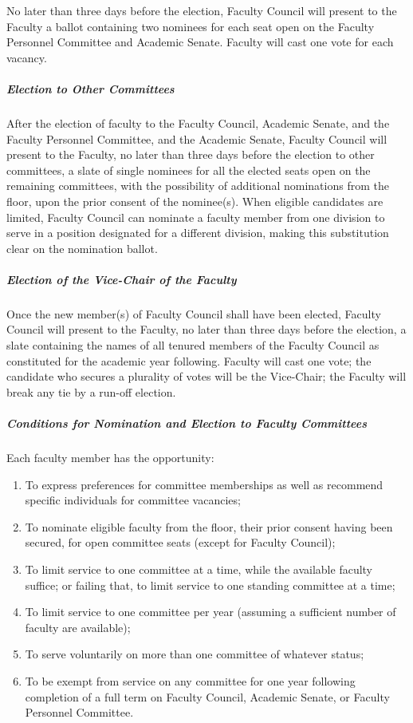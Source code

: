 					No later than three days before the election, Faculty Council will present to the Faculty a ballot containing two nominees for each seat open on the Faculty Personnel Committee and Academic Senate.  Faculty will cast one vote for each vacancy.
				\subparagraph{Election to Other Committees}
					After the election of faculty to the Faculty Council, Academic Senate, and the Faculty Personnel Committee, and the Academic Senate, Faculty Council will present to the Faculty, no later than three days before the election to other committees, a slate of single nominees for all the elected seats open on the remaining committees, with the possibility of additional nominations from the floor, upon the prior consent of the nominee(s).  When eligible candidates are limited, Faculty Council can nominate a faculty member from one division to serve in a position designated for a different division, making this substitution clear on the nomination ballot.
				\subparagraph{Election of the Vice-Chair of the Faculty}
					Once the new member(s) of Faculty Council shall have been elected, Faculty Council will present to the Faculty, no later than three days before the election, a slate containing the names of all tenured members of the Faculty Council as constituted for the academic year following.  Faculty will cast one vote; the candidate who secures a plurality of votes will be the Vice-Chair; the Faculty will break any tie by a run-off election.
				\subparagraph{Conditions for Nomination and Election to Faculty Committees}
					\label{sec:CommitteesOfTheFaculty-Conditions}
					Each faculty member has the opportunity:
					\begin{enumerate}[label=\alph*)]
						\item{
							\label{sec:CommitteesOfTheFaculty-Conditions-First}
							To express preferences for committee memberships as well as recommend specific individuals for committee vacancies;}
						\item{To nominate eligible faculty from the floor, their prior consent having been secured, for open committee seats (except for Faculty Council);}
						\item{To limit service to one committee at a time, while the available faculty suffice; or failing that, to limit service to one standing committee at a time;}
						\item{To limit service to one committee per year (assuming a sufficient number of faculty are available);}
						\item{To serve voluntarily on more than one committee of whatever status;}
						\item{To be exempt from service on any committee for one year following completion of a full term on Faculty Council, Academic Senate, or Faculty Personnel Committee.}
					\end{enumerate}
